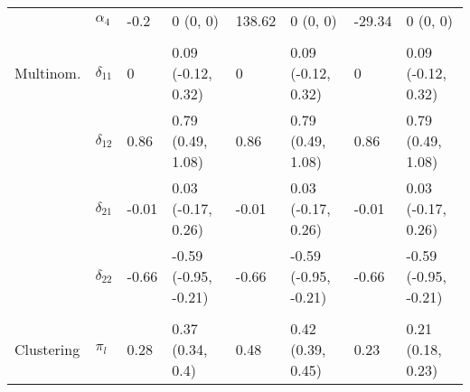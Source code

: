 \documentclass[]{article}
\begin{document}
\begin{table}[t]
\begin{tabular}{llllllll}
\hspace{1em} & $\alpha_{4}$ & -0.2 & 0 (0, 0) & 138.62 & 0 (0, 0) & -29.34 & 0 (0, 0)\\
\addlinespace[0.3em]
\multicolumn{8}{l}{\textbf{ }}\\
\hspace{1em}Multinom. & $\delta_{11}$ & 0 & 0.09 (-0.12, 0.32) & 0 & 0.09 (-0.12, 0.32) & 0 & 0.09 (-0.12, 0.32)\\
\hspace{1em} & $\delta_{12}$ & 0.86 & 0.79 (0.49, 1.08) & 0.86 & 0.79 (0.49, 1.08) & 0.86 & 0.79 (0.49, 1.08)\\
\hspace{1em} & $\delta_{21}$ & -0.01 & 0.03 (-0.17, 0.26) & -0.01 & 0.03 (-0.17, 0.26) & -0.01 & 0.03 (-0.17, 0.26)\\
\hspace{1em} & $\delta_{22}$ & -0.66 & -0.59 (-0.95, -0.21) & -0.66 & -0.59 (-0.95, -0.21) & -0.66 & -0.59 (-0.95, -0.21)\\
\addlinespace[0.3em]
\multicolumn{8}{l}{\textbf{ }}\\
\hspace{1em}Clustering & $\pi_l$ & 0.28 & 0.37 (0.34, 0.4) & 0.48 & 0.42 (0.39, 0.45) & 0.23 & 0.21 (0.18, 0.23)\\
\bottomrule
\end{tabular}
\end{table}
\end{document}
